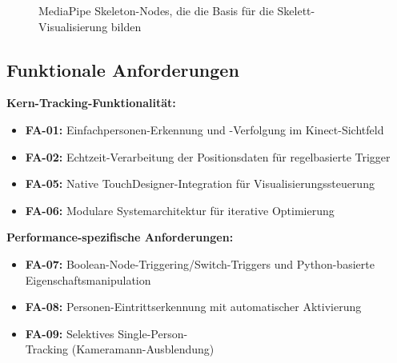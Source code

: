 \begin{figure}[htbp]
    \centering
    \caption{MediaPipe Skeleton-Nodes, die die Basis für die Skelett-Visualisierung bilden}
    \label{fig:mediapipe_nodes}
\end{figure}

\subsection{Funktionale Anforderungen}

\textbf{Kern-Tracking-Funktionalität:}
\begin{itemize}
    \item \textbf{FA-01:} Einfachpersonen-Erkennung und -Verfolgung im Kinect-Sichtfeld
    \item \textbf{FA-02:} Echtzeit-Verarbeitung der Positionsdaten für regelbasierte Trigger
    \item \textbf{FA-05:} Native TouchDesigner-Integration für Visualisierungssteuerung
    \item \textbf{FA-06:} Modulare Systemarchitektur für iterative Optimierung
\end{itemize}

\textbf{Performance-spezifische Anforderungen:}
\begin{itemize}
    \item \textbf{FA-07:} Boolean-Node-Triggering/Switch-Triggers und Python-basierte Eigenschaftsmanipulation
    \item \textbf{FA-08:} Personen-Eintrittserkennung mit automatischer Aktivierung
    \item \textbf{FA-09:} Selektives Single-Person-\\Tracking (Kameramann-Ausblendung)
\end{itemize}

